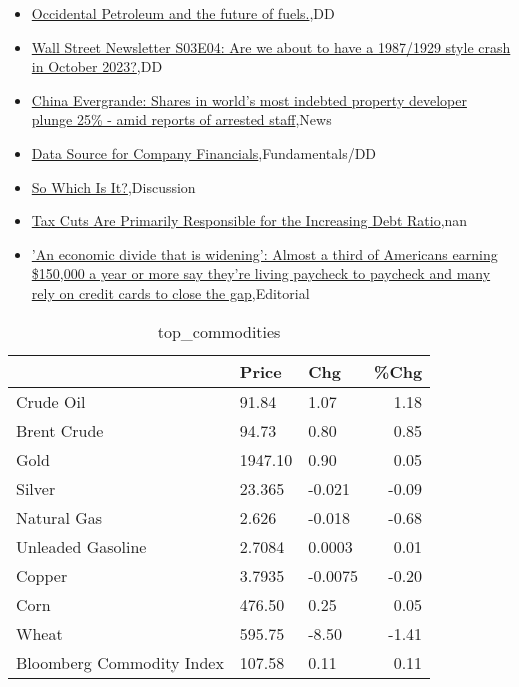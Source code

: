 \documentclass{article}%
\begin{document}
%
\begin{itemize}%
\item%
\href{https://reddit.com/r/wallstreetbets/comments/16ltriz/occidental\_petroleum\_and\_the\_future\_of\_fuels/}{Occidental Petroleum and the future of fuels.},DD%
\item%
\href{https://reddit.com/r/wallstreetbets/comments/16lrymu/wall\_street\_newsletter\_s03e04\_are\_we\_about\_to/}{Wall Street Newsletter S03E04: Are we about to have a 1987/1929 style crash in October 2023?},DD%
\item%
\href{https://reddit.com/r/wallstreetbets/comments/16lrv0f/china\_evergrande\_shares\_in\_worlds\_most\_indebted/}{China Evergrande: Shares in world's most indebted property developer plunge 25\% - amid reports of arrested staff},News%
\item%
\href{https://reddit.com/r/StockMarket/comments/16lf2wv/data\_source\_for\_company\_financials/}{Data Source for Company Financials},Fundamentals/DD%
\item%
\href{https://reddit.com/r/StockMarket/comments/16l8ydz/so\_which\_is\_it/}{So Which Is It?},Discussion%
\item%
\href{https://reddit.com/r/Economics/comments/16lmkay/tax\_cuts\_are\_primarily\_responsible\_for\_the/}{Tax Cuts Are Primarily Responsible for the Increasing Debt Ratio},nan%
\item%
\href{https://reddit.com/r/Economics/comments/16lkdjf/an\_economic\_divide\_that\_is\_widening\_almost\_a/}{'An economic divide that is widening': Almost a third of Americans earning \$150,000 a year or more say they're living paycheck to paycheck and many rely on credit cards to close the gap},Editorial%
\end{itemize}%


\begin{table}[htbp]%
\caption{top\_commodities}%
\centering%
\begin{adjustbox}{width=1\textwidth}%
\begin{tabular}{lllr}
\toprule
                          &   Price &     Chg &  \%Chg \\
\midrule
               Crude Oil  &   91.84 &    1.07 &  1.18 \\
             Brent Crude  &   94.73 &    0.80 &  0.85 \\
                    Gold  & 1947.10 &    0.90 &  0.05 \\
                  Silver  &  23.365 &  -0.021 & -0.09 \\
             Natural Gas  &   2.626 &  -0.018 & -0.68 \\
       Unleaded Gasoline  &  2.7084 &  0.0003 &  0.01 \\
                  Copper  &  3.7935 & -0.0075 & -0.20 \\
                    Corn  &  476.50 &    0.25 &  0.05 \\
                   Wheat  &  595.75 &   -8.50 & -1.41 \\
Bloomberg Commodity Index &  107.58 &    0.11 &  0.11 \\
\bottomrule
\end{tabular}
%
\end{adjustbox}%
\end{table}
\end{document}
